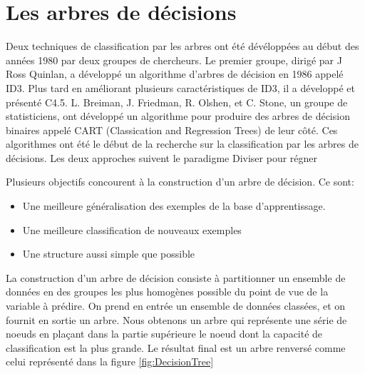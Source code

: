 \section{Les arbres de décisions}

Deux techniques de classification par les arbres ont été dévéloppées au
début des années 1980 par deux groupes de chercheurs.
Le premier groupe, dirigé par J Ross Quinlan, a développé un algorithme d'arbres
de décision en 1986 appelé ID3. Plus tard en améliorant plusieurs 
caractéristiques de ID3, il a développé et présenté C4.5.
L. Breiman, J. Friedman, R. Olshen, et C. Stone, un groupe de statisticiens, 
ont développé un algorithme pour produire des arbres de décision binaires 
appelé CART (Classication and Regression Trees) de leur côté. Ces algorithmes
ont été le début de la recherche sur la classification par les arbres de
décisions.  Les deux approches suivent le paradigme \og Diviser pour régner \fg

Plusieurs objectifs concourent à la construction d'un arbre de décision. Ce
sont:
\begin{itemize}
  \item Une meilleure généralisation des exemples de la base d'apprentissage.
  \item Une meilleure classification de nouveaux exemples
  \item Une structure aussi simple que possible
\end{itemize}
La construction d'un arbre de décision consiste à partitionner un ensemble de 
données en des groupes les plus homogènes possible du point de vue de la 
variable à prédire. On prend en entrée un ensemble de données classées, et on 
fournit en sortie un arbre. Nous obtenons un arbre qui représente une série de 
noeuds en plaçant dans la partie supérieure le noeud dont la capacité de 
classification est la plus grande. \cite{criminisi2011} 
Le résultat final est un arbre renversé comme celui représenté dans la figure
\ref{fig:DecisionTree}

